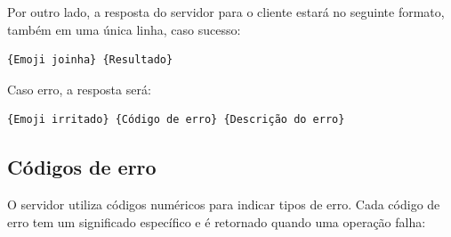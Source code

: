 \documentclass{article}
\begin{document}
Por outro lado, a resposta do servidor para o cliente estará no seguinte formato, também em uma única linha, caso sucesso:

\begin{Verbatim}[tabsize=4]
	{Emoji joinha} {Resultado}
\end{Verbatim}

Caso erro, a resposta será:

\begin{Verbatim}[tabsize=4]
	{Emoji irritado} {Código de erro} {Descrição do erro}
\end{Verbatim}

\subsection{Códigos de erro}

O servidor utiliza códigos numéricos para indicar tipos de erro. Cada código de erro tem um significado específico e é retornado quando uma operação falha:
\end{document}

